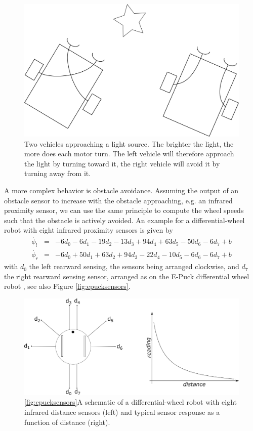 \begin{figure}
\centering
\includegraphics[width=0.7\columnwidth]{figs/braitenberg.png}
\caption{Two vehicles approaching a light source. The brighter the light, the more does each motor turn. The left vehicle will therefore approach the light by turning toward it, the right vehicle will avoid it by turning away from it.\label{fig:braitenberg}}
\end{figure}

A more complex behavior is obstacle avoidance. Assuming the output of an obstacle sensor to increase with the obstacle approaching, e.g. an infrared proximity sensor, we can use the same principle to compute the wheel speeds such that the obstacle is actively avoided. An example for a differential-wheel robot with eight infrared proximity sensors is given by
\begin{eqnarray}
\nonumber
\dot{\phi_l}&=&-6d_0-6d_1-19d_2-13d_3+94d_4+63d_5-50d_6-6d_7+b\\
\nonumber
\dot{\phi_r}&=&-6d_0+50d_1+63d_2+94d_3-22d_4-10d_5-6d_6-6d_7+b
\end{eqnarray}
%
%
with $d_0$ the left rearward sensing, the sensors being arranged clockwise, and $d_7$ the right rearward sensing sensor, arranged as on the E-Puck differential wheel robot \cite{mondada2009puck}, see also Figure \ref{fig:epucksensors}.

\begin{figure}
\centering
\includegraphics[width=0.9\columnwidth]{figs/ePuck.png}
\caption{\ref{fig:epucksensors}A schematic of a differential-wheel robot with eight infrared distance sensors (left) and typical sensor response as a function of distance (right).}
\end{figure}

